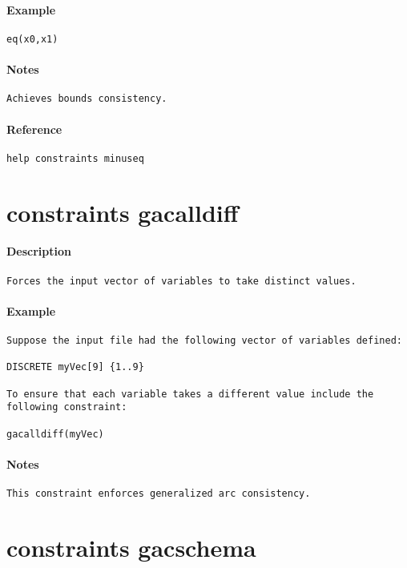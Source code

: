 \paragraph{Example}
{\footnotesize
\begin{verbatim}
eq(x0,x1)
\end{verbatim}
}
\paragraph{Notes}
{\footnotesize
\begin{verbatim}
Achieves bounds consistency.
\end{verbatim}
}
\paragraph{Reference}
{\footnotesize
\begin{verbatim}
help constraints minuseq
\end{verbatim}
}
\section{constraints gacalldiff}
\paragraph{Description}
{\footnotesize
\begin{verbatim}
Forces the input vector of variables to take distinct values.
\end{verbatim}
}
\paragraph{Example}
{\footnotesize
\begin{verbatim}
Suppose the input file had the following vector of variables defined:

DISCRETE myVec[9] {1..9}

To ensure that each variable takes a different value include the
following constraint:

gacalldiff(myVec)
\end{verbatim}
}
\paragraph{Notes}
{\footnotesize
\begin{verbatim}
This constraint enforces generalized arc consistency.
\end{verbatim}
}
\section{constraints gacschema}
